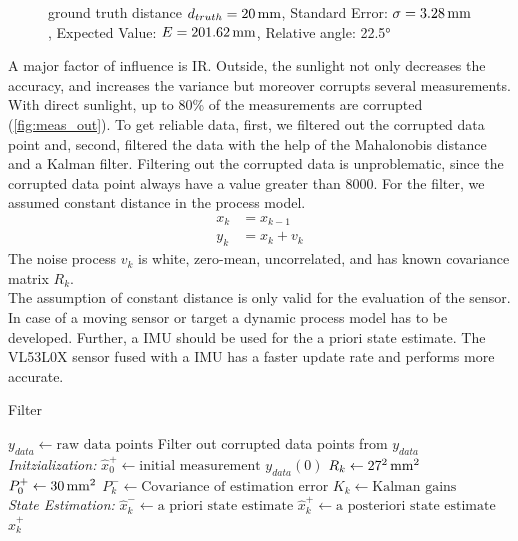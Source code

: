 \begin{figure}
\begin{minipage}{0.3\textwidth}
		\caption{ground truth distance $d_{truth}= \unit[20]{mm}$, Standard Error: $\sigma=\unit[3.28]{mm}$, Expected Value: $E=\unit[201.62]{mm}$, Relative angle: 22.5°}
		\label{fig:angl22.5}
	\end{minipage}
\end{figure}

A major factor of influence is IR. Outside, the sunlight not only decreases the accuracy, and increases the variance but moreover corrupts several measurements. With direct sunlight, up to 80\% of the measurements are corrupted (\cref{fig:meas_out}). To get reliable data, first, we filtered out the corrupted data point and, second, filtered the data with the help of the Mahalonobis distance and a Kalman filter. Filtering out the corrupted data is unproblematic, since the corrupted data point always have a value greater than 8000. For the filter, we assumed constant distance in the process model. 
\begin{equation}
	\label{eq:filter2}
	\begin{split} 
	x_k & = x_{k-1} \\
	y_k & = x_k + v_k
	\end{split}
\end{equation}
The noise process $v_k$ is white, zero-mean, uncorrelated, and has known covariance matrix  $R_k$.\\
The assumption of constant distance is only valid for the evaluation of the sensor. In case of a moving sensor or target a dynamic process model has to be developed. Further, a IMU should be used for the a priori state estimate. The VL53L0X sensor fused with a IMU has a faster update rate and performs more accurate. \\

\begin{algorithm}
	\caption{Filter}\label{alg:filter2}
	\begin{algorithmic}[1]
		\State $y_{data}\gets \text{raw data points}$ 
		\State Filter out corrupted data points from $y_{data}$ \\
		\textit{Initzialization:}
		\State $\hat{x}^+_0\gets\text{initial measurement }y_{data}(0)$
		\State $R_k\gets\unit[27^2]{mm^2}$ 
		\State $P^+_0\gets \unit[30]{mm^2}$ 
		\For{ each $k = (0, \text{ number of data point]}$}	
			\State  $P^-_k \gets \text{Covariance of estimation error}$
			\State	$K_k \gets \text{Kalman gains}$
		\EndFor \\
		\textit{State Estimation:}	 
		\For{ each $k = (0, \text{ number of data point]}$}
			\State {} 
			\State $\hat{x}^-_k \gets \text{a priori state estimate}$
			\State $\hat{x}^+_k \gets \text{a posteriori state estimate}$
		\EndFor
		\State \Return $\hat{x}^+_k$
		\EndProcedure

	\end{algorithmic}
\end{algorithm}

